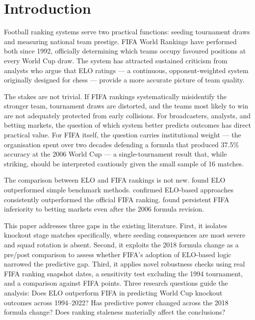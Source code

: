 \documentclass[12pt, a4paper]{article}
\begin{document}
\section{Introduction}

Football ranking systems serve two practical functions: seeding tournament draws and measuring
national team prestige. FIFA World Rankings have performed both since 1992, officially
determining which teams occupy favoured positions at every World Cup draw. The system has
attracted sustained criticism from analysts who argue that ELO ratings --- a continuous,
opponent-weighted system originally designed for chess --- provide a more accurate picture of
team quality.

The stakes are not trivial. If FIFA rankings systematically misidentify the stronger team,
tournament draws are distorted, and the teams most likely to win are not adequately protected
from early collisions. For broadcasters, analysts, and betting markets, the question of which
system better predicts outcomes has direct practical value. For FIFA itself, the question carries
institutional weight --- the organisation spent over two decades defending a formula that produced 37.5\% accuracy at the 2006 World Cup --- a single-tournament result that, while striking, should be interpreted cautiously given the small sample of 16 matches.

The comparison between ELO and FIFA rankings is not new.  found ELO
outperformed simple benchmark methods.  confirmed ELO-based approaches
consistently outperformed the official FIFA ranking.  found persistent
FIFA inferiority to betting markets even after the 2006 formula revision.

This paper addresses three gaps in the existing literature. First, it isolates knockout stage
matches specifically, where seeding consequences are most severe and squad rotation is absent.
Second, it exploits the 2018 formula change as a pre/post comparison to assess whether FIFA's adoption of ELO-based logic narrowed the predictive gap. Third, it applies novel
robustness checks using real FIFA ranking snapshot dates, a sensitivity test excluding the 1994
tournament, and a comparison against FIFA points. Three research questions guide the analysis:
Does ELO outperform FIFA in predicting World Cup knockout outcomes across 1994--2022? Has
predictive power changed across the 2018 formula change? Does ranking staleness materially
affect the conclusions?
\end{document}

